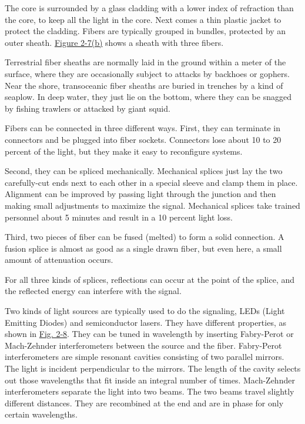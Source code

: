 
The core is surrounded by a glass cladding with a lower index of
refraction than the core, to keep all the light in the core. Next comes
a thin plastic jacket to protect the cladding. Fibers are typically
grouped in bundles, protected by an outer sheath.
\protect\hyperlink{0130661023_ch02lev1sec2.htmlux5cux23ch02fig07}{Figure
2-7(b)} shows a sheath with three fibers.

Terrestrial fiber sheaths are normally laid in the ground within a meter
of the surface, where they are occasionally subject to attacks by
backhoes or gophers. Near the shore, transoceanic fiber sheaths are
buried in trenches by a kind of seaplow. In deep water, they just lie on
the bottom, where they can be snagged by fishing trawlers or attacked by
giant squid.

Fibers can be connected in three different ways. First, they can
terminate in connectors and be plugged into fiber sockets. Connectors
lose about 10 to 20 percent of the light, but they make it easy to
reconfigure systems.

Second, they can be spliced mechanically. Mechanical splices just lay
the two carefully-cut ends next to each other in a special sleeve and
clamp them in place. Alignment can be improved by passing light through
the junction and then making small adjustments to maximize the signal.
Mechanical splices take trained personnel about 5 minutes and result in
a 10 percent light loss.

Third, two pieces of fiber can be fused (melted) to form a solid
connection. A fusion splice is almost as good as a single drawn fiber,
but even here, a small amount of attenuation occurs.

For all three kinds of splices, reflections can occur at the point of
the splice, and the reflected energy can interfere with the signal.

Two kinds of light sources are typically used to do the signaling, LEDs
(Light Emitting Diodes) and semiconductor lasers. They have different
properties, as shown in
\protect\hyperlink{0130661023_ch02lev1sec2.htmlux5cux23ch02fig08}{Fig.
2-8}. They can be tuned in wavelength by inserting Fabry-Perot or
Mach-Zehnder interferometers between the source and the fiber.
Fabry-Perot interferometers are simple resonant cavities consisting of
two parallel mirrors. The light is incident perpendicular to the
mirrors. The length of the cavity selects out those wavelengths that fit
inside an integral number of times. Mach-Zehnder interferometers
separate the light into two beams. The two beams travel slightly
different distances. They are recombined at the end and are in phase for
only certain wavelengths.


